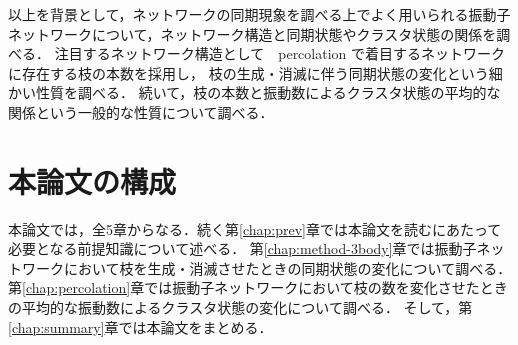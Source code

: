 \documentclass[../main]{subfiles}
\begin{document}
以上を背景として，ネットワークの同期現象を調べる上でよく用いられる振動子ネットワークについて，ネットワーク構造と同期状態やクラスタ状態の関係を調べる．
注目するネットワーク構造として　percolation で着目するネットワークに存在する枝の本数を採用し，
枝の生成・消滅に伴う同期状態の変化という細かい性質を調べる．
続いて，枝の本数と振動数によるクラスタ状態の平均的な関係という一般的な性質について調べる．
\section{本論文の構成}
\label{chap:intro-config}
本論文では，全5章からなる．続く第\ref{chap:prev}章では本論文を読むにあたって必要となる前提知識について述べる．
第\ref{chap:method-3body}章では振動子ネットワークにおいて枝を生成・消滅させたときの同期状態の変化について調べる．
第\ref{chap:percolation}章では振動子ネットワークにおいて枝の数を変化させたときの平均的な振動数によるクラスタ状態の変化について調べる．
そして，第\ref{chap:summary}章では本論文をまとめる．
\end{document}
